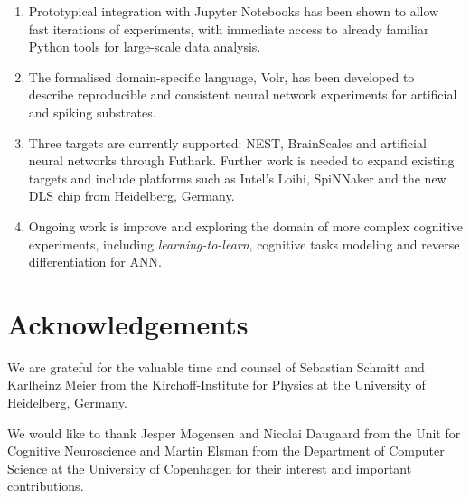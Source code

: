 \documentclass[a0,portrait]{a0poster}
\begin{document}
\begin{multicols}{2}
\begin{enumerate}
\item Prototypical integration with Jupyter Notebooks has been shown to allow fast iterations of experiments, with immediate access to already familiar Python tools for large-scale data analysis.
\item The formalised domain-specific language, Volr, has been developed to describe reproducible and consistent neural network experiments for artificial and spiking substrates.
\item Three targets are currently supported: NEST, BrainScales and artificial neural networks through Futhark. Further work is needed to expand existing targets and include platforms such as Intel's Loihi, SpiNNaker and the new DLS chip from Heidelberg, Germany.
\item Ongoing work is improve and exploring the domain of more complex cognitive
  experiments, including \textit{learning-to-learn}, cognitive 
tasks modeling and reverse differentiation for ANN.
\end{enumerate}

\color{DarkSlateGray} %


\nocite{*} %


\section*{Acknowledgements}
We are grateful for the valuable time and counsel of Sebastian Schmitt and Karlheinz Meier 
from the Kirchoff-Institute for Physics at the University of Heidelberg, Germany.

We would like to thank Jesper Mogensen and Nicolai Daugaard from the Unit for Cognitive 
Neuroscience and Martin Elsman from the Department of Computer Science at the University of 
Copenhagen for their interest and important contributions.


\end{multicols}
\end{document}
